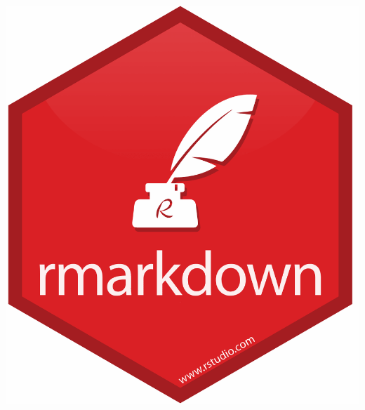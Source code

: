 \documentclass[
  12pt,
]{article}
\author{}
\date{\vspace{-2.5em}}
\begin{document}




\begin{center}\includegraphics[width=1\linewidth,height=1\textheight]{../Document_Rmarkdown/R} \end{center}

\newpage

\textcolor{blue}{\tableofcontents}

\newpage

\listoftables
\listoffigures
\newpage

\renewcommand{\headrulewidth}{1.5pt}
\let\oldheadrule\headrule                            
\renewcommand{\headrule}{\color{blue}\oldheadrule}%
\renewcommand{\footrulewidth}{1.5pt} 
\let\oldfootrule\footrule%
\renewcommand{\footrule}{\color{blue}\oldfootrule}%
\pagestyle{fancy}        %
\chead{} %
\rhead{\textcolor{black}{2024}} %
\lfoot{\textcolor{black}{ENSAE}} %
%
\end{document}
